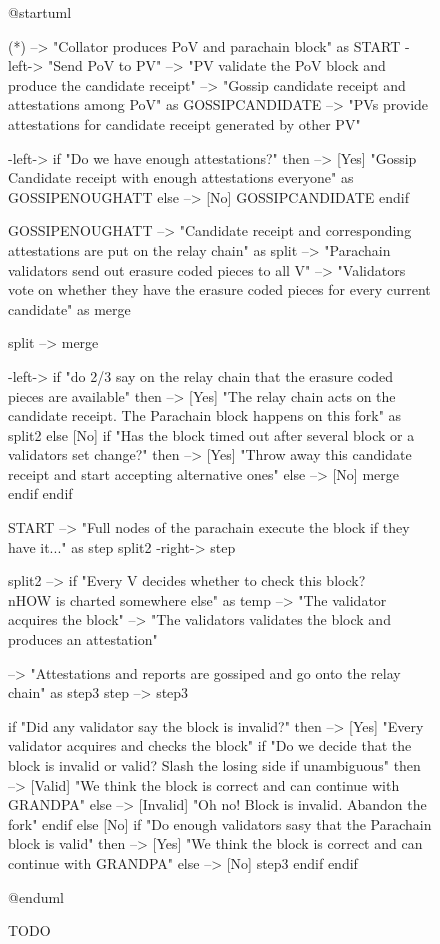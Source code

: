 \documentclass{book}
\begin{document}
\begin{figure}[h!]
\begin{plantuml}
@startuml

(*) --> "Collator produces PoV and parachain block" as START
-left-> "Send PoV to PV"
--> "PV validate the PoV block and produce the candidate receipt"
--> "Gossip candidate receipt and attestations among PoV" as GOSSIPCANDIDATE
--> "PVs provide attestations for candidate receipt generated by other PV"

-left-> if "Do we have enough attestations?" then
    --> [Yes] "Gossip Candidate receipt with enough attestations everyone" as GOSSIPENOUGHATT
else
    --> [No] GOSSIPCANDIDATE
endif

GOSSIPENOUGHATT --> "Candidate receipt and corresponding attestations are put on the relay chain" as split
--> "Parachain validators send out erasure coded pieces to all V"
--> "Validators vote on whether they have the erasure coded pieces for every current candidate" as merge

split --> merge

-left-> if "do 2/3 say on the relay chain that the erasure coded pieces are available" then
    --> [Yes] "The relay chain acts on the candidate receipt. The Parachain block happens on this fork" as split2
else
    [No] if "Has the block timed out after several block or a validators set change?" then
        --> [Yes] "Throw away this candidate receipt and start accepting alternative ones"
    else
        --> [No] merge
    endif
endif

START --> "Full nodes of the parachain execute the block if they have it..." as step
split2 -right-> step

split2 --> if "Every V decides whether to check this block?\\nHOW is charted somewhere else" as temp
--> "The validator acquires the block"
--> "The validators validates the block and produces an attestation"

--> "Attestations and reports are gossiped and go onto the relay chain" as step3
step --> step3

if "Did any validator say the block is invalid?" then
    --> [Yes] "Every validator acquires and checks the block"
    if "Do we decide that the block is invalid or valid? Slash the losing side if unambiguous" then
        --> [Valid] "We think the block is correct and can continue with GRANDPA"
    else
        --> [Invalid] "Oh no! Block is invalid. Abandon the fork"
    endif
else
    [No] if "Do enough validators sasy that the Parachain block is valid" then
        --> [Yes] "We think the block is correct and can continue with GRANDPA"
    else
        --> [No] step3
    endif
endif

@enduml
\end{plantuml}
\caption{TODO}
\end{figure}
\end{document}
